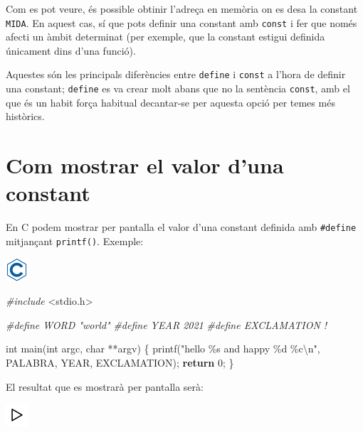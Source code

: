 \documentclass[
]{book}
\newenvironment{Shaded}{\begin{snugshade}}{\end{snugshade}}
\newcommand{\ControlFlowTok}[1]{\textcolor[rgb]{0.13,0.29,0.53}{\textbf{#1}}}
\newcommand{\DataTypeTok}[1]{\textcolor[rgb]{0.13,0.29,0.53}{#1}}
\newcommand{\DecValTok}[1]{\textcolor[rgb]{0.00,0.00,0.81}{#1}}
\newcommand{\ImportTok}[1]{#1}
\newcommand{\NormalTok}[1]{#1}
\newcommand{\PreprocessorTok}[1]{\textcolor[rgb]{0.56,0.35,0.01}{\textit{#1}}}
\newcommand{\SpecialCharTok}[1]{\textcolor[rgb]{0.00,0.00,0.00}{#1}}
\newcommand{\StringTok}[1]{\textcolor[rgb]{0.31,0.60,0.02}{#1}}
\begin{document}
Com es pot veure, és possible obtinir l'adreça en memòria on es desa la constant \texttt{MIDA}. En aquest cas, sí que pots definir una constant amb \texttt{const} i fer que només afecti un àmbit determinat (per exemple, que la constant estigui definida únicament dins d'una funció).

Aquestes són les principals diferències entre \texttt{define} i \texttt{const} a l'hora de definir una constant; \texttt{define} es va crear molt abans que no la sentència \texttt{const}, amb el que és un habit força habitual decantar-se per aquesta opció per temes més històrics.

\hypertarget{com-mostrar-el-valor-duna-constant}{%
\section{Com mostrar el valor d'una constant}\label{com-mostrar-el-valor-duna-constant}}

En C podem mostrar per pantalla el valor d'una constant definida amb \texttt{\#define} mitjançant \texttt{printf()}. Exemple:

\includegraphics{./img/c.png}

\begin{Shaded}
\begin{Highlighting}[]
\PreprocessorTok{\#include }\ImportTok{\textless{}stdio.h\textgreater{}}

\PreprocessorTok{\#define WORD "world"}
\PreprocessorTok{\#define YEAR 2021}
\PreprocessorTok{\#define EXCLAMATION \textquotesingle{}!\textquotesingle{}}

\DataTypeTok{int}\NormalTok{ main(}\DataTypeTok{int}\NormalTok{ argc, }\DataTypeTok{char}\NormalTok{ **argv) \{}
\NormalTok{    printf(}\StringTok{"hello \%s and happy \%d \%c}\SpecialCharTok{\textbackslash{}n}\StringTok{"}\NormalTok{, PALABRA, YEAR, EXCLAMATION);}
    \ControlFlowTok{return} \DecValTok{0}\NormalTok{;}
\NormalTok{\}}
\end{Highlighting}
\end{Shaded}

El resultat que es mostrarà per pantalla serà:

\includegraphics{./img/play.png}
\end{document}
